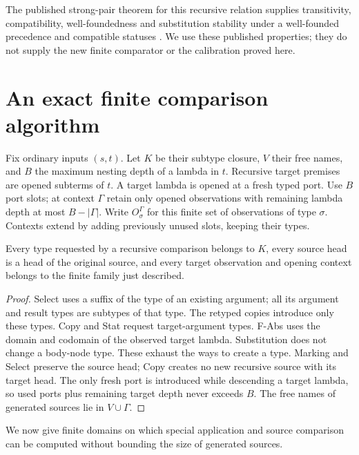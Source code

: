 \documentclass[11pt,a4paper]{article}
\begin{document}
The published strong-pair theorem for this recursive relation supplies
transitivity, compatibility, well-foundedness and substitution stability
under a well-founded precedence and compatible statuses
\cite[Theorems 5.32, 5.37 and 5.39]{kop}.  We use these published properties;
they do not supply the new finite comparator or the calibration proved here.

\section{An exact finite comparison algorithm}\label{sec:comparator}
Fix ordinary inputs $(s,t)$.  Let $K$ be their subtype closure, $V$ their free
names, and $B$ the maximum nesting depth of a lambda in $t$.  Recursive target
premises are opened subterms of $t$.  A target lambda is opened at a fresh
typed port.  Use $B$ port slots; at context $\Gamma$ retain only opened
observations with remaining lambda depth at most $B-|\Gamma|$.
Write $O_\sigma^\Gamma$ for this finite set of observations of type $\sigma$.
Contexts extend by adding previously unused slots, keeping their types.

\begin{lemma}\label{lem:finiteclosure}
Every type requested by a recursive comparison belongs to $K$, every source
head is a head of the original source, and every target observation and
opening context belongs to the finite family just described.
\end{lemma}
\begin{proof}
Select uses a suffix of the type of an existing argument; all its argument
and result types are subtypes of that type.  The retyped copies introduce
only these types.  Copy and Stat request target-argument types.  F-Abs uses
the domain and codomain of the observed target lambda.  Substitution does
not change a body-node type.  These exhaust the ways to create a type.
Marking and Select preserve the source head; Copy creates no new recursive
source with its target head.  The only fresh port is introduced while
descending a target lambda, so used ports plus remaining target depth never
exceeds $B$.  The free names of generated sources lie in $V\cup\Gamma$.
\end{proof}

We now give finite domains on which special application and source comparison
can be computed without bounding the size of generated sources.
\end{document}
